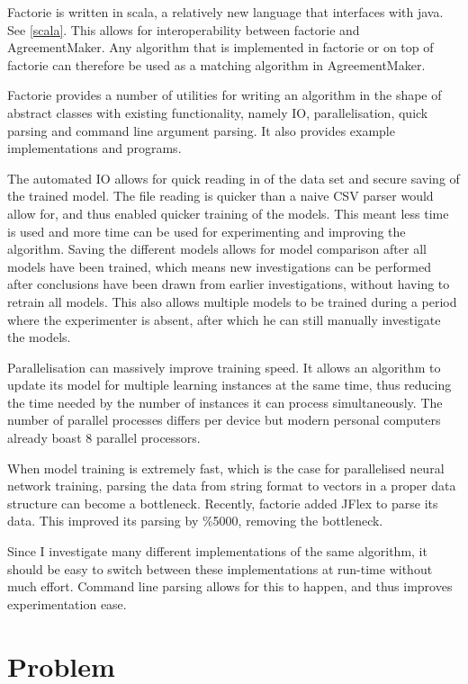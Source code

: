 \documentclass{article}
\begin{document}
 Factorie is written in scala, a relatively new language that interfaces with java. See \ref{scala}. This allows for interoperability between factorie and AgreementMaker. Any algorithm that is implemented in factorie or on top of factorie can therefore be used as a matching algorithm in AgreementMaker.
 
 Factorie provides a number of utilities for writing an algorithm in the shape of abstract classes with existing functionality, namely IO, parallelisation, quick parsing and command line argument parsing. It also provides example implementations and programs.
 
 The automated IO allows for quick reading in of the data set and secure saving of the trained model. The file reading is quicker than a naive CSV parser would allow for, and thus enabled quicker training of the models. This meant less time is used and more time can be used for experimenting and improving the algorithm. Saving the different models allows for model comparison after all models have been trained, which means new investigations can be performed after conclusions have been drawn from earlier investigations, without having to retrain all models. This also allows multiple models to be trained during a period where the experimenter is absent, after which he can still manually investigate the models.
 
 Parallelisation can massively improve training speed. It allows an algorithm to update its model for multiple learning instances at the same time, thus reducing the time needed by the number of instances it can process simultaneously. The number of parallel processes differs per device but modern personal computers already boast 8 parallel processors.
 
 When model training is extremely fast, which is the case for parallelised neural network training, parsing the data from string format to vectors in a proper data structure can become a bottleneck. Recently, factorie added JFlex to parse its data. This improved its parsing by \%5000, removing the bottleneck.
 
 Since I investigate many different implementations of the same algorithm, it should be easy to switch between these implementations at run-time without much effort. Command line parsing allows for this to happen, and thus improves experimentation ease.
 
 \newpage
 \section{Problem}
\end{document}

